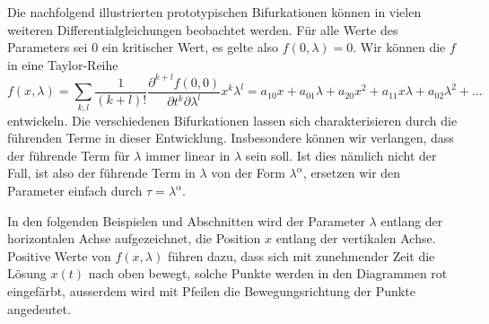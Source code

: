 Die nachfolgend illustrierten prototypischen Bifurkationen können in vielen
%
weiteren Differentialgleichungen beobachtet werden. 
Für alle Werte des Parameters sei $0$ ein kritischer Wert,
es gelte also $f(0,\lambda)=0$.
Wir können die $f$ in eine Taylor-Reihe 
\begin{equation}
f(x,\lambda)
=
\sum_{k,l} \frac{1}{(k+l)!}\frac{\partial^{k+l} f(0,0)}{\partial t^k\partial\lambda^l} x^k\lambda^l
=
a_{10}x + a_{01}\lambda
+
a_{20}x^2 + a_{11}x\lambda + a_{02}\lambda^2 + \dots
\end{equation}
entwickeln.
Die verschiedenen Bifurkationen lassen sich charakterisieren durch
die führenden Terme in dieser Entwicklung.
Insbesondere können wir verlangen, dass der führende Term für $\lambda$
immer linear in $\lambda$ sein soll.
Ist dies nämlich nicht der Fall, ist also der führende Term in 
$\lambda$ von der Form $\lambda^\alpha$, ersetzen wir den
Parameter einfach durch $\tau=\lambda^\alpha$.

In den folgenden Beispielen und Abschnitten wird der Parameter $\lambda$
entlang der horizontalen Achse aufgezeichnet, die Position $x$
entlang der vertikalen Achse.
Positive Werte von $f(x,\lambda)$ führen dazu, dass sich mit zunehmender
Zeit die Lösung $x(t)$ nach oben bewegt, solche Punkte werden in den
Diagrammen rot eingefärbt, ausserdem wird mit Pfeilen die Bewegungsrichtung
der Punkte angedeutet.

